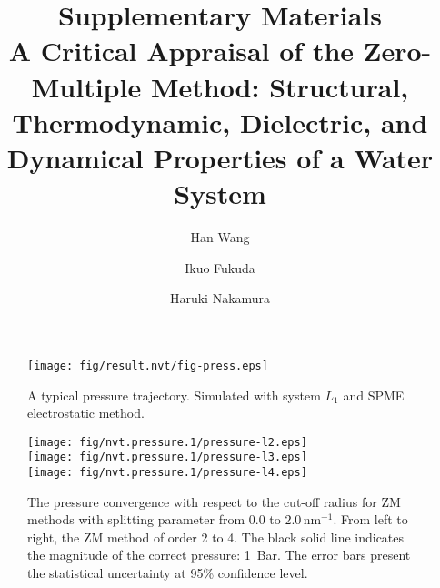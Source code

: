 \documentclass[aip,jcp,a4paper,reprint,unsortedaddress,onecolumn,fleqn]{revtex4}
\begin{document}
\title{\textbf{Supplementary Materials}\\
  A Critical Appraisal of the Zero-Multiple Method: Structural,
Thermodynamic, Dielectric, and Dynamical Properties of a Water System}
\author{Han Wang}
\author{Ikuo Fukuda}
\author{Haruki Nakamura}

\begin{abstract}
\end{abstract}

\maketitle
{}


\begin{figure}[]
\centering
\texttt{[image: fig/result.nvt/fig-press.eps]}\\
\caption{A typical pressure trajectory. Simulated with system $L_1$ and SPME electrostatic method.}
\label{fig:pres-l1}
\end{figure}


\begin{figure}[]
\centering
\texttt{[image: fig/nvt.pressure.1/pressure-l2.eps]}\\
\texttt{[image: fig/nvt.pressure.1/pressure-l3.eps]}\\
\texttt{[image: fig/nvt.pressure.1/pressure-l4.eps]}
\caption{The pressure convergence with respect to the cut-off radius for ZM
methods with splitting parameter from $0.0$ to $2.0\,\text{nm}^{-1}$. From
left to right, the ZM method of order 2 to 4. The black
solid line indicates the magnitude of the correct pressure: 1~Bar. The error
bars present the statistical uncertainty at 95\% confidence level.}
\label{fig:pres-l1}
\end{figure}
\end{document}

